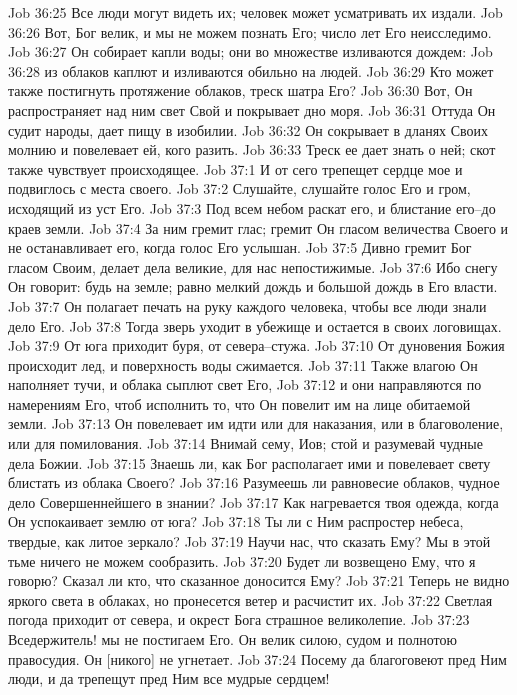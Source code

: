Job 36:25  Все люди могут видеть их; человек может усматривать их издали.
Job 36:26  Вот, Бог велик, и мы не можем познать Его; число лет Его неисследимо.
Job 36:27  Он собирает капли воды; они во множестве изливаются дождем:
Job 36:28  из облаков каплют и изливаются обильно на людей.
Job 36:29  Кто может также постигнуть протяжение облаков, треск шатра Его?
Job 36:30  Вот, Он распространяет над ним свет Свой и покрывает дно моря.
Job 36:31  Оттуда Он судит народы, дает пищу в изобилии.
Job 36:32  Он сокрывает в дланях Своих молнию и повелевает ей, кого разить.
Job 36:33  Треск ее дает знать о ней; скот также чувствует происходящее.
Job 37:1  И от сего трепещет сердце мое и подвиглось с места своего.
Job 37:2  Слушайте, слушайте голос Его и гром, исходящий из уст Его.
Job 37:3  Под всем небом раскат его, и блистание его--до краев земли.
Job 37:4  За ним гремит глас; гремит Он гласом величества Своего и не останавливает его, когда голос Его услышан.
Job 37:5  Дивно гремит Бог гласом Своим, делает дела великие, для нас непостижимые.
Job 37:6  Ибо снегу Он говорит: будь на земле; равно мелкий дождь и большой дождь в Его власти.
Job 37:7  Он полагает печать на руку каждого человека, чтобы все люди знали дело Его.
Job 37:8  Тогда зверь уходит в убежище и остается в своих логовищах.
Job 37:9  От юга приходит буря, от севера--стужа.
Job 37:10  От дуновения Божия происходит лед, и поверхность воды сжимается.
Job 37:11  Также влагою Он наполняет тучи, и облака сыплют свет Его,
Job 37:12  и они направляются по намерениям Его, чтоб исполнить то, что Он повелит им на лице обитаемой земли.
Job 37:13  Он повелевает им идти или для наказания, или в благоволение, или для помилования.
Job 37:14  Внимай сему, Иов; стой и разумевай чудные дела Божии.
Job 37:15  Знаешь ли, как Бог располагает ими и повелевает свету блистать из облака Своего?
Job 37:16  Разумеешь ли равновесие облаков, чудное дело Совершеннейшего в знании?
Job 37:17  Как нагревается твоя одежда, когда Он успокаивает землю от юга?
Job 37:18  Ты ли с Ним распростер небеса, твердые, как литое зеркало?
Job 37:19  Научи нас, что сказать Ему? Мы в этой тьме ничего не можем сообразить.
Job 37:20  Будет ли возвещено Ему, что я говорю? Сказал ли кто, что сказанное доносится Ему?
Job 37:21  Теперь не видно яркого света в облаках, но пронесется ветер и расчистит их.
Job 37:22  Светлая погода приходит от севера, и окрест Бога страшное великолепие.
Job 37:23  Вседержитель! мы не постигаем Его. Он велик силою, судом и полнотою правосудия. Он [никого] не угнетает.
Job 37:24  Посему да благоговеют пред Ним люди, и да трепещут пред Ним все мудрые сердцем!
